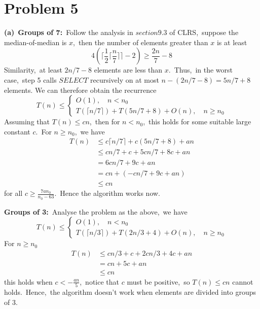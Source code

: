 \documentclass[]{article}
\begin{document}
	\section{Problem 5}
	\textbf{(a)}\ \textbf{Groups of 7:}\ Follow the analysis in $section 9.3$ of CLRS,\ suppose the median-of-median is $x$,\ then the number of elements greater than $x$ is at least
	\begin{equation*}
		4(\lceil \frac{1}{2}\lceil\frac{n}{7}\rceil\rceil - 2) \geq \frac{2n}{7} - 8
	\end{equation*} 
	Similarity,\ at least $2n/7 - 8$ elements are less than $x$.\ Thus,\ in the worst case,\ step 5 calls $SELECT$ recursively on at most $n - (2n/7 - 8) = 5n/7 + 8$ elements.
	We can therefore obtain the recurrence
	\[ T(n) \leq \begin{cases}
	O(1),\quad n < n_0 \\
	T(\lceil n/7 \rceil) + T(5n/7 + 8) + O(n),\quad n\geq n_0
	\end{cases} \]
	Assuming that $T(n)\leq cn$,\ then for $n<n_0$,\ this holds for some suitable large constant $c$.\ For $n\geq n_0$,\ we have
	\begin{equation*}
		\begin{aligned}
		T(n) & \leq c\lceil n/7 \rceil + c(5n/7 + 8) + an\\
		& \leq cn/7 + c + 5cn/7 + 8c + an\\
		& = 6cn/7 + 9c + an\\
		& = cn + (-cn/7 + 9c + an)\\
		& \leq cn 
		\end{aligned}
	\end{equation*}
	for all $c \geq \frac{7an_0}{n_0-63}$.\ Hence the algorithm works now.
	
	\textbf{Groups of 3:}\ Analyse the problem as the above,\ we have
	\[ T(n) \leq \begin{cases}
	O(1),\quad n < n_0 \\
	T(\lceil n/3 \rceil) + T(2n/3 + 4) + O(n),\quad n\geq n_0
	\end{cases} \]
	For $n\geq n_0$
	\begin{equation*}
	\begin{aligned}
		T(n) & \leq cn/3 + c + 2cn/3 + 4c + an\\
		& = cn + 5c + an\\
		& \leq cn 
	\end{aligned}
	\end{equation*}
	this holds when $c < -\frac{an}{5}$,\ notice that $c$ must be positive,\ so $T(n) \leq cn$ cannot holds.\ Hence,\ the algorithm doesn't work when elements are divided into groups of $3$.
	
\end{document}
